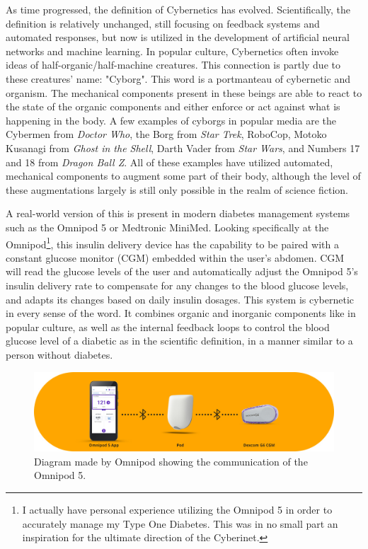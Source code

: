 As time progressed, the definition of Cybernetics has evolved. Scientifically, the definition is relatively unchanged, still focusing on feedback systems and automated responses, but now is utilized in the development of artificial neural networks and machine learning\cite{Cariani2010}. In popular culture, Cybernetics often invoke ideas of half-organic/half-machine creatures. This connection is partly due to these creatures' name: "Cyborg". This word is a portmanteau of cybernetic and organism. The mechanical components present in these beings are able to react to the state of the organic components and either enforce or act against what is happening in the body. A few examples of cyborgs in popular media are the Cybermen from \textit{Doctor Who}, the Borg from \textit{Star Trek}, RoboCop, Motoko Kusanagi from \textit{Ghost in the Shell}, Darth Vader from \emph{Star Wars}, and Numbers 17 and 18 from \textit{Dragon Ball Z}. All of these examples have utilized automated, mechanical components to augment some part of their body, although the level of these augmentations largely is still only possible in the realm of science fiction.

A real-world version of this is present in modern diabetes management systems such as the Omnipod 5 or Medtronic MiniMed. Looking specifically at the Omnipod\footnote{I actually have personal experience utilizing the Omnipod 5 in order to accurately manage my Type One Diabetes. This was in no small part an inspiration for the ultimate direction of the Cyberinet.}, this insulin delivery device has the capability to be paired with a constant glucose monitor (CGM) embedded within the user's abdomen. CGM will read the glucose levels of the user and automatically adjust the Omnipod 5's insulin delivery rate to compensate for any changes to the blood glucose levels, and adapts its changes based on daily insulin dosages. This system is cybernetic in every sense of the word. It combines organic and inorganic components like in popular culture, as well as the internal feedback loops to control the blood glucose level of a diabetic as in the scientific definition, in a manner similar to a person without diabetes.

\begin{figure} %
    \centering
    \includegraphics[scale=0.4]{diagrams/Omnipod-5_CGM_Pod_BT_1040x277.jpg}
    \caption{Diagram made by Omnipod showing the communication of the Omnipod 5.} %
    \label{fig:omnipod}
\end{figure}

